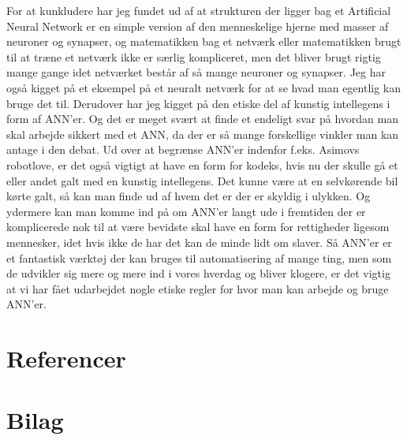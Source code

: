 \documentclass[12pt]{article}
\begin{document}
For at kunkludere har jeg fundet ud af at strukturen der ligger bag et Artificial Neural Network er en simple version af den menneskelige hjerne
med masser af neuroner og synapser, og matematikken bag et netværk eller matematikken brugt til at træne et netværk ikke er særlig kompliceret, men
det bliver brugt rigtig mange gange idet netværket består af så mange neuroner og synapser. Jeg har også kigget på et eksempel på et neuralt netværk
for at se hvad man egentlig kan bruge det til. Derudover har jeg kigget på den etiske del af kunstig
intellegens i form af ANN'er. Og det er meget svært at finde et endeligt svar på hvordan man skal arbejde sikkert med et ANN, da der er så mange forskellige
vinkler man kan antage i den debat. Ud over at begrænse ANN'er indenfor f.eks. Asimovs robotlove, er det også vigtigt at have en form for kodeks, hvis nu
der skulle gå et eller andet galt med en kunstig intellegens. Det kunne være at en selvkørende bil kørte galt, så kan man finde ud af hvem det er der er
skyldig i ulykken. Og ydermere kan man komme ind på om ANN'er langt ude i fremtiden der er komplicerede nok til at være bevidste skal have en form for
rettigheder ligesom mennesker, idet hvis ikke de har det kan de minde lidt om slaver. Så ANN'er er et fantastisk værktøj der kan bruges til automatisering
af mange ting, men som de udvikler sig mere og mere ind i vores hverdag og bliver klogere, er det vigtig at vi har fået udarbejdet nogle etiske regler
for hvor man kan arbejde og bruge ANN'er.

\pagebreak

\section{Referencer}

\printbibliography[type=book, title={Bøger}]
\printbibliography[type=online, title={Artikler og andre online kilder}]

\section{Bilag}
\end{document}

